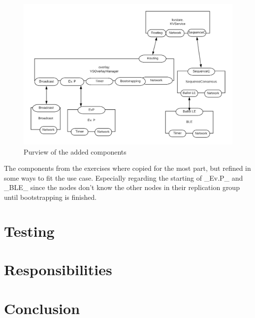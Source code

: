 \documentclass[a4paper]{scrartcl}
\begin{document}
\begin{figure}[h!]
  \begin{center}
    \includegraphics[scale=0.4]{Modified.png}
    \caption{Purview of the added components}
    \label{fig:modified}
  \end{center}
\end{figure}

The components from the exercises where copied for the most part, but refined in some ways to fit the use case.
Especially regarding the starting of _Ev.P_ and _BLE_ since the nodes don't know the other nodes in their replication group until bootstrapping is finished.


\section{Testing}


\section{Responsibilities}


\section{Conclusion}
\end{document}
